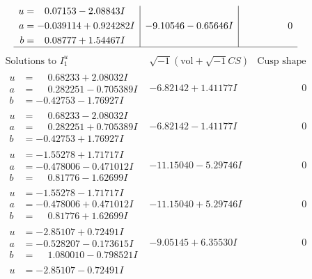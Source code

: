 \documentclass[1p]{elsarticle_modified}
\theoremstyle{definition}
\newcommand{\I}{\sqrt{-1}}
\begin{document}
$$\begin{array}{c|c|c}
\begin{aligned}
u &= \phantom{-}0.07153 - 2.08843 I \\
a &= -0.039114 + 0.924282 I \\
b &= \phantom{-}0.08777 + 1.54467 I\end{aligned}
 & -9.10546 - 0.65646 I & \phantom{-0.000000 } 0\\
 \hline 
 \end{array}$$\newpage$$\begin{array}{c|c|c}  
\text{Solutions to }I^u_{1}& \I (\text{vol} + \sqrt{-1}CS) & \text{Cusp shape}\\
 \hline 
\begin{aligned}
u &= \phantom{-}0.68233 + 2.08032 I \\
a &= \phantom{-}0.282251 - 0.705389 I \\
b &= -0.42753 - 1.76927 I\end{aligned}
 & -6.82142 + 1.41177 I & \phantom{-0.000000 } 0 \\ \hline\begin{aligned}
u &= \phantom{-}0.68233 - 2.08032 I \\
a &= \phantom{-}0.282251 + 0.705389 I \\
b &= -0.42753 + 1.76927 I\end{aligned}
 & -6.82142 - 1.41177 I & \phantom{-0.000000 } 0 \\ \hline\begin{aligned}
u &= -1.55278 + 1.71717 I \\
a &= -0.478006 - 0.471012 I \\
b &= \phantom{-}0.81776 - 1.62699 I\end{aligned}
 & -11.15040 - 5.29746 I & \phantom{-0.000000 } 0 \\ \hline\begin{aligned}
u &= -1.55278 - 1.71717 I \\
a &= -0.478006 + 0.471012 I \\
b &= \phantom{-}0.81776 + 1.62699 I\end{aligned}
 & -11.15040 + 5.29746 I & \phantom{-0.000000 } 0 \\ \hline\begin{aligned}
u &= -2.85107 + 0.72491 I \\
a &= -0.528207 - 0.173615 I \\
b &= \phantom{-}1.080010 - 0.798521 I\end{aligned}
 & -9.05145 + 6.35530 I & \phantom{-0.000000 } 0 \\ \hline\begin{aligned}
u &= -2.85107 - 0.72491 I \\

\end{aligned}
\end{array}$$
\end{document}

